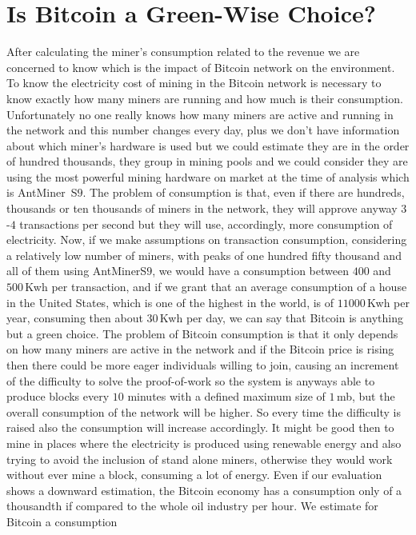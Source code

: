 \documentclass[USenglish]{uit-thesis}
\begin{document}
\section{Is Bitcoin a Green-Wise Choice?}
After calculating the miner's consumption related
to the revenue we are concerned to know
which is the impact of Bitcoin network on the environment.
To know the electricity cost of mining in the Bitcoin
network is necessary to know exactly how many
miners are running and how much is their
consumption. Unfortunately
no one really knows how many
miners are active and running in the network
and this number changes every day, plus we don't
have information about which miner's hardware is
used but we could estimate
they are in the order of hundred thousands, they group in
mining pools and we could consider they are using
the most powerful mining hardware on market
at the time of analysis which is AntMiner~S$9$.
The problem of consumption
is that, even if there are hundreds, thousands or ten
thousands of miners in the network, they will approve
anyway $3$-$4$ transactions per second but they will use, accordingly,
more consumption of electricity.
Now, if we make assumptions on transaction consumption,
considering a relatively low number of miners, with peaks
of one hundred fifty thousand and all of them using AntMinerS$9$,
we would have a consumption between $400$ and
$500$\,Kwh per transaction, and if we grant that an
average consumption of a house in the United States,
which is one of the highest in the world, is of
$11000$\,Kwh per year, consuming then about
$30$\,Kwh per day, we can say
that Bitcoin is anything
but a green choice.
The problem of Bitcoin consumption is that
it only depends on how many miners are
active in the network and if the Bitcoin price
is rising then there could be more eager
individuals willing to join, causing an increment
of the difficulty to solve the proof-of-work so
the system is anyways able to produce
blocks every $10$ minutes
with a defined maximum size of $1$\,\gls{mb},
but the overall consumption of the network
will be higher. So every time the difficulty
is raised also the consumption will increase
accordingly.
It might be good then to mine in places
where the electricity is produced using
renewable energy and also trying to avoid
the inclusion of stand alone
miners, otherwise they would work without
ever mine a block, consuming a lot of energy.
Even if our evaluation shows a downward estimation,
the Bitcoin economy has a consumption
only of a thousandth if compared to the
whole oil industry per hour.
We estimate for Bitcoin a consumption
\end{document}

